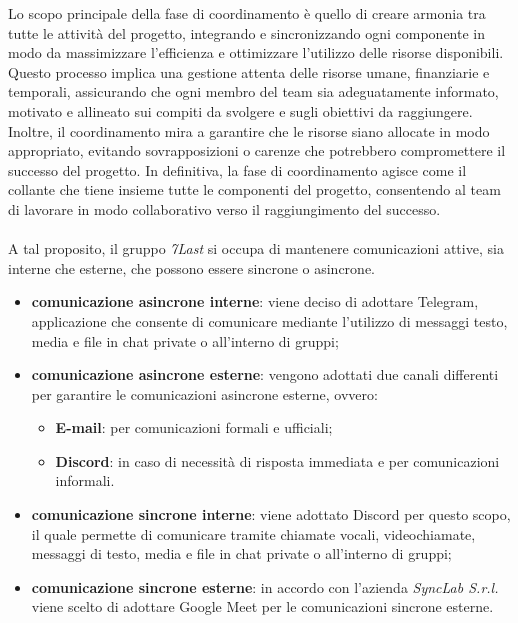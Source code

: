 Lo scopo principale della fase di coordinamento è quello di creare armonia tra tutte le attività del progetto, integrando e sincronizzando ogni componente in modo da massimizzare l'efficienza e ottimizzare l'utilizzo delle risorse disponibili. Questo processo implica una gestione attenta delle risorse umane, finanziarie e temporali, assicurando che ogni membro del team sia adeguatamente informato, motivato e allineato sui compiti da svolgere e sugli obiettivi da raggiungere. Inoltre, il coordinamento mira a garantire che le risorse siano allocate in modo appropriato, evitando sovrapposizioni o carenze che potrebbero compromettere il successo del progetto. In definitiva, la fase di coordinamento agisce come il collante che tiene insieme tutte le componenti del progetto, consentendo al team di lavorare in modo collaborativo verso il raggiungimento del successo.\\\\A tal proposito, il gruppo \textit{7Last} si occupa di mantenere comunicazioni attive, sia interne che esterne, che possono essere sincrone o asincrone.
\begin{itemize}
    \item \textbf{comunicazione asincrone interne}: viene deciso di adottare Telegram, applicazione che consente di comunicare mediante l'utilizzo di messaggi testo, media e file in chat private o all'interno di gruppi;
    \item \textbf{comunicazione asincrone esterne}: vengono adottati due canali differenti per garantire le comunicazioni asincrone esterne, ovvero: 
        \begin{itemize}
            \item \textbf{E-mail}: per comunicazioni formali e ufficiali;
            \item \textbf{Discord}: in caso di necessità di risposta immediata e per comunicazioni informali.
        \end{itemize}
\end{itemize}
\begin{itemize}
    \item \textbf{comunicazione sincrone interne}: viene adottato Discord per questo scopo, il quale permette di comunicare tramite chiamate vocali, videochiamate, messaggi di testo, media e file in chat private o all'interno di gruppi;
    \item \textbf{comunicazione sincrone esterne}: in accordo con l'azienda \textit{SyncLab S.r.l.} viene scelto di adottare Google Meet per le comunicazioni sincrone esterne. 
\end{itemize}

